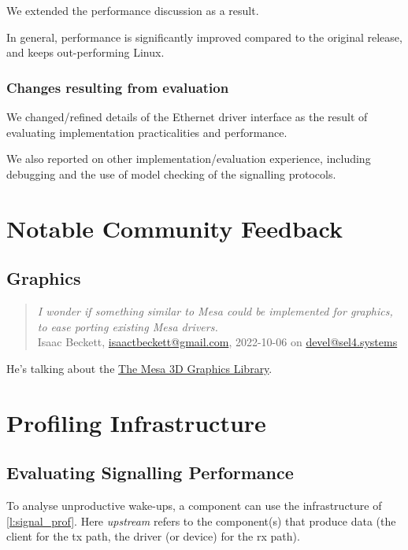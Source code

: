 \documentclass[a4paper,12pt]{report}
\begin{document}
We extended the performance discussion as a result.

In general, performance is significantly improved compared to the
original release, and keeps out-performing Linux.

\subsection{Changes resulting from evaluation}

We changed/refined details of the Ethernet driver interface as the
result of evaluating implementation practicalities and performance.

We also reported on other implementation/evaluation experience,
including debugging and the use of model checking of the signalling protocols.

\ifDraft

\newcommand{\email}[1]{\href{mailto:#1}{#1}}

\chapter{Notable Community Feedback}

\section{Graphics}

\begin{quotation}{\em
  I wonder if something similar to Mesa could be implemented for
  graphics, to ease porting existing Mesa drivers.}\\\noindent
  Isaac Beckett, \email{isaactbeckett@gmail.com}, 2022-10-06 on \email{devel@sel4.systems}
\end{quotation}

He's talking about the \href{https://docs.mesa3d.org}{The Mesa 3D Graphics Library}.


\chapter{Profiling Infrastructure}

\section{Evaluating Signalling Performance}

To analyse unproductive wake-ups, a component can use the
infrastructure of \autoref{l:signal_prof}. Here \emph{upstream} refers
to the component(s) that produce data (the client for the \gls{tx} path, the
driver (or device) for the \gls{rx} path).
\end{document}
